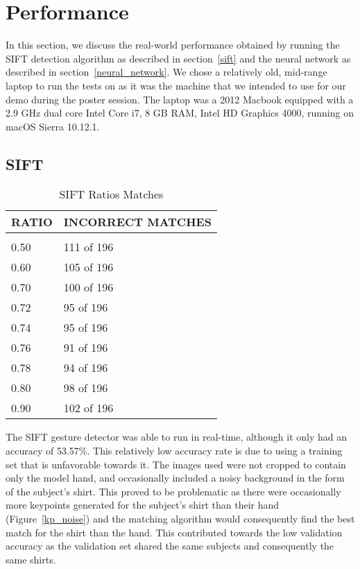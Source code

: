 \section{Performance}
\label{performance}

In this section, we discuss the real-world performance obtained by running the SIFT detection algorithm as described in section~\ref{sift} and the neural network as described in section~\ref{neural_network}. We chose a relatively old, mid-range laptop to run the tests on as it was the machine that we intended to use for our demo during the poster session. The laptop was a 2012 Macbook equipped with a 2.9 GHz dual core Intel Core i7, 8 GB RAM, Intel HD Graphics 4000, running on macOS Sierra 10.12.1.

\subsection{SIFT}
\label{perf_SIFT}

\begin{table}[t]
\caption{SIFT Ratios Matches}
\label{sift_ratios}
\begin{center}
\begin{tabular}{ll}
\multicolumn{1}{c}{\bf RATIO}  &\multicolumn{1}{c}{\bf INCORRECT MATCHES}
\\ \hline \\
0.50             &111 of 196 \\
0.60             &105 of 196 \\
0.70             &100 of 196 \\
0.72             &95 of 196 \\
0.74             &95 of 196 \\
0.76             &91 of 196 \\
0.78             &94 of 196 \\
0.80             &98 of 196 \\
0.90             &102 of 196 \\
\end{tabular}
\end{center}
\end{table}

The SIFT gesture detector was able to run in real-time, although it only had an accuracy of 53.57\%. This relatively low accuracy rate is due to using a training set that is unfavorable towards it. The images used were not cropped to contain only the model hand, and occasionally included a noisy background in the form of the subject's shirt. This proved to be problematic as there were occasionally more keypoints generated for the subject's shirt than their hand (Figure~\ref{kp_noise}) and the matching algorithm would consequently find the best match for the shirt than the hand. This contributed towards the low validation accuracy as the validation set shared the same subjects and consequently the same shirts.

